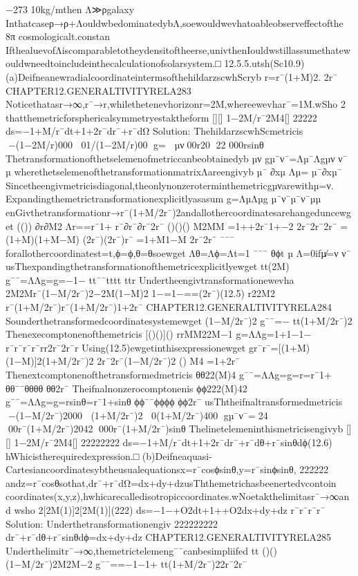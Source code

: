 {{{{{{{{{{{{{{{{−273
10kg/mthen
Λ≫ρgalaxy
Inthatcaseρ→ρ+ΛouldwbedominatedybΛ,soewouldwevhatoableobserveffectofthe
8π
cosmologicalt.constan
IfthealuevofΛiscomparabletotheydensitoftheerse,univthenIouldwstillassumethatew
ouldwneedtoincludeinthecalculationofsolarsystem.□
12.5.5.utsh(Sc10.9)
(a)DeifneanewradialcoordinateintermsofthehildarzscwhScryb
r=r¯(1+M)2.
2r¯
CHAPTER12.GENERALTIVITYRELA283
Noticethatasr→∞,r¯→r,whilethetenevhorizonr=2M,whereewevhar¯=1M.wSho
2
thatthemetricforsphericalsymmetryestaktheform
[][]
1−2M/r¯2M4[]
22222
ds=−1+M/r¯dt+1+2r¯dr¯+r¯dΩ
Solution:
ThehildarzscwhScmetricis
−(1−2M/r)000
01/(1−2M/r)00
g=
µν00r20
22
000rsinθ
Thetransformationofthetselemenofmetriccanbeobtainedyb
µν
gµ¯ν¯=Λµ¯Λgµν
ν¯
µ
wherethetselemenofthetransformationmatrixΛareengivyb
µ¯
∂xµ
Λµ=
µ¯∂xµ¯
Sincetheengivmetricisdiagonal,theonlynonzeroterminthemetricgµνarewithµ=ν.
Expandingthemetrictransformationexplicitlyasasum
g=ΛµΛµg
µ¯ν¯µ¯ν¯µµ
enGivthetransformationr→r¯(1+M/2r¯)2andallothercoordinatesarehangeduncewget
(())
∂r∂M2
Λr==r¯1+
r¯∂r¯∂r¯2r¯
()()()
M2MM
=1++2r¯1+−2
2r¯2r¯2r¯
=(1+M)(1+M−M)
(2r¯)(2r¯)r¯
=1+M1−M
2r¯2r¯
¯¯¯
forallothercoordinatest=t,ϕ=ϕ,θ=θsoewget
Λθ=Λϕ=Λt=1
¯¯¯
θϕt
µ
Λ=0ifµ̸=ν
ν¯
usThexpandingthetransformationofthemetricexplicitlyewget
tt(2M)
g¯¯=ΛΛg=g=−1−
tt¯¯tttt
ttr
Undertheengivtransformationewevha
2M2Mr¯(1−M/2r¯)2−2M(1−M)2
1−=1−==(2r¯)(12.5)
r22M2
r¯(1+M/2r¯)r¯(1+M/2r¯)1+2r¯
CHAPTER12.GENERALTIVITYRELA284
Sounderthetransformedcoordinatesystemewget
(1−M/2r¯)2
g¯¯=−
tt(1+M/2r¯)2
Thenexecomptonenofthemetricis
[()()]()
rrMM22M−1
g=ΛΛg=1+1−1−
r¯r¯r¯r¯rr2r¯2r¯r
Using(12.5)ewgetinthisexpressionewget
gr¯r¯=[(1+M)(1−M)]2(1+M/2r¯)2
2r¯2r¯(1−M/2r¯)2
()
M4
=1+2r¯
Thenextcomptonenofthetransformedmetricis
θθ22(M)4
g¯¯=ΛΛg=g=r=r¯1+
θθ¯¯θθθθ
θθ2r¯
Theifnalnonzerocomptonenis
ϕϕ222(M)42
g¯¯=ΛΛg=g=rsinθ=r¯1+sinθ
ϕϕ¯¯ϕϕϕϕ
ϕϕ2r¯
usThtheifnaltransformedmetricis
−(1−M/2r¯)2000
(1+M/2r¯)2
0(1+M/2r¯)400
gµ¯ν¯=24
00r¯(1+M/2r¯)2042
000r¯(1+M/2r¯)sinθ
Thelinetelemeninthismetricisengivyb
[][]
1−2M/r¯2M4[]
22222222
ds=−1+M/r¯dt+1+2r¯dr¯+r¯dθ+r¯sinθdϕ(12.6)
hWhicistherequiredexpression.□
(b)Deifneaquasi-Cartesiancoordinatesybtheusualequationsx=r¯cosϕsinθ,y=r¯sinϕsinθ,
222222
andz=r¯cosθsothat,dr¯+r¯dΩ=dx+dy+dzusThthemetrichasbeenertedvcontoin
coordinates(x,y,z),hwhicarecalledisotropiccoordinates.wNoetakthelimitasr¯→∞and
wsho
2[2M(1)]2[2M(1)](222)
ds=−1−+O2dt+1++O2dx+dy+dz
r¯r¯r¯r¯
Solution:
Underthetransformationengiv
222222222
dr¯+r¯dθ+r¯sinθdϕ=dx+dy+dz
CHAPTER12.GENERALTIVITYRELA285
Underthelimitr¯→∞,themetrictelemeng¯¯canbesimpliifed
tt
()()
(1−M/2r¯)2M2M−2
g¯¯==−1−1+
tt(1+M/2r¯)22r¯2r¯
}}}}}}}}}}}}}}}}
